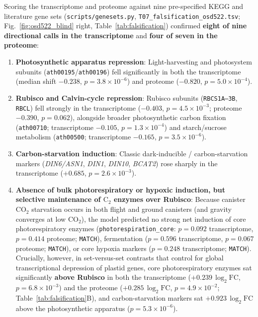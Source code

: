 \documentclass[final,5p,times,twocolumn,numbers,sort&compress]{elsarticle}
\begin{document}
Scoring the transcriptome and proteome against nine pre-specified KEGG and literature gene sets (\texttt{scripts/genesets.py}, \texttt{T07\_falsification\_osd522.tsv}; Fig.~\ref{fig:osd522_blind} right, Table~\ref{tab:falsification}) confirmed \textbf{eight of nine directional calls in the transcriptome} and \textbf{four of seven in the proteome}:
\begin{enumerate}
    \item \textbf{Photosynthetic apparatus repression}: Light-harvesting and photosystem subunits (\texttt{ath00195}/\texttt{ath00196}) fell significantly in both the transcriptome (median shift $-0.238$, $p = 3.8\times 10^{-6}$) and proteome ($-0.820$, $p = 5.0\times 10^{-4}$).
    \item \textbf{Rubisco and Calvin-cycle repression}: Rubisco subunits (\texttt{RBCS1A--3B}, \texttt{RBCL}) fell strongly in the transcriptome ($-0.403$, $p = 4.5\times 10^{-3}$; proteome $-0.390$, $p = 0.062$), alongside broader photosynthetic carbon fixation (\texttt{ath00710}; transcriptome $-0.105$, $p = 1.3\times 10^{-4}$) and starch/sucrose metabolism (\texttt{ath00500}; transcriptome $-0.165$, $p = 3.5\times 10^{-6}$).
    \item \textbf{Carbon-starvation induction}: Classic dark-inducible / carbon-starvation markers (\textit{DIN6/ASN1}, \textit{DIN1}, \textit{DIN10}, \textit{BCAT2}) rose sharply in the transcriptome ($+0.685$, $p = 2.6\times 10^{-3}$).
    \item \textbf{Absence of bulk photorespiratory or hypoxic induction, but selective maintenance of $\mathrm{C_2}$ enzymes over Rubisco}: Because canister $\mathrm{CO_2}$ starvation occurs in both flight and ground canisters (and gravity converges at low $\mathrm{CO_2}$), the model predicted no strong net induction of core photorespiratory enzymes (\texttt{photorespiration\_core}: $p = 0.092$ transcriptome, $p = 0.414$ proteome; \texttt{MATCH}), fermentation ($p = 0.596$ transcriptome, $p = 0.067$ proteome; \texttt{MATCH}), or core hypoxia markers ($p = 0.248$ transcriptome; \texttt{MATCH}). Crucially, however, in set-versus-set contrasts that control for global transcriptional depression of plastid genes, core photorespiratory enzymes sat significantly \textbf{above Rubisco} in both the transcriptome ($+0.239\,\log_2\mathrm{FC}$, $p = 6.8\times 10^{-3}$) and the proteome ($+0.285\,\log_2\mathrm{FC}$, $p = 4.9\times 10^{-2}$; Table~\ref{tab:falsification}B), and carbon-starvation markers sat $+0.923\,\log_2\mathrm{FC}$ above the photosynthetic apparatus ($p = 5.3\times 10^{-6}$).
\end{enumerate}
\end{document}
